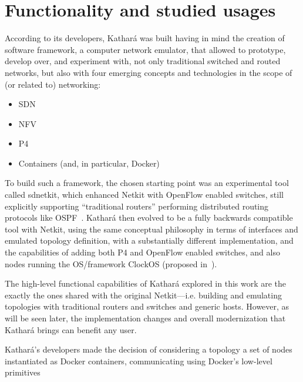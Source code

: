 \section{Functionality and studied usages}
\label{sec:katharafunctionality}

According to its developers, Kathará was built having in mind the creation of software framework, a computer network emulator, that allowed to prototype, develop over, and experiment with, not only traditional switched and routed networks, but also with four emerging concepts and technologies in the scope of (or related to) networking:
\begin{itemize}
	\item SDN
	\item NFV
	\item P4~\cite{p4programming} %
	\item Containers (and, in particular, Docker)
\end{itemize}

To build such a framework, the chosen starting point was an experimental tool called sdnetkit, which enhanced Netkit with OpenFlow enabled switches, still explicitly supporting ``traditional routers'' performing distributed routing protocols like OSPF~\cite{sdnkit}.
Kathará then evolved to be a fully backwards compatible tool with Netkit, using the same conceptual philosophy in terms of interfaces and emulated topology definition, with a substantially different implementation, and the capabilities of adding both P4 and OpenFlow enabled switches, and also nodes running the OS/framework ClockOS (proposed in~\cite{clockos}).

The high-level functional capabilities of Kathará explored in this work are the exactly the ones shared with the original Netkit---i.e. building and emulating topologies with traditional routers and switches and generic hosts.
However, as will be seen later, the implementation changes and overall modernization that Kathará brings can benefit any user.

Kathará's developers made the decision of considering a topology a set of nodes instantiated as Docker containers, communicating using Docker's low-level primitives

